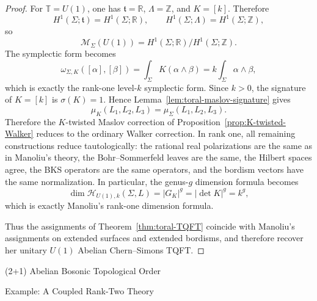 \documentclass[12pt]{amsart}
\makeatletter
\renewcommand\section{\@startsection{section}{1}%
  \z@{.7\linespacing\@plus\linespacing}{.5\linespacing}%
  {\normalfont\bfseries\centering}}
\renewcommand\subsection{\@startsection{subsection}{2}%
  \z@{.5\linespacing\@plus.7\linespacing}{-.5em}%
  {\normalfont\bfseries}}
\numberwithin{equation}{section}
\makeatother
\begin{document}
\begin{proof}
For \(\mathbb T=U(1)\), one has \(\mathfrak t=\mathbb R\), \(\Lambda=\mathbb Z\), and
\(K=[k]\). Therefore
\[
H^1(\Sigma;\mathfrak t)=H^1(\Sigma;\mathbb R),\qquad
H^1(\Sigma;\Lambda)=H^1(\Sigma;\mathbb Z),
\]
so
\[
\mathcal M_\Sigma(U(1))
=
H^1(\Sigma;\mathbb R)/H^1(\Sigma;\mathbb Z).
\]
The symplectic form becomes
\[
\omega_{\Sigma,K}([\alpha],[\beta])
=
\int_\Sigma K(\alpha\wedge\beta)
=
k\int_\Sigma \alpha\wedge\beta,
\]
which is exactly the rank-one level-\(k\) symplectic form. Since \(k>0\), the signature of \(K=[k]\) is $\sigma(K)=1.$ Hence Lemma~\ref{lem:toral-maslov-signature} gives
\[
\mu_K(L_1,L_2,L_3)=\mu_\Sigma(L_1,L_2,L_3).
\]
Therefore the \(K\)-twisted Maslov correction of
Proposition~\ref{prop:K-twisted-Walker} reduces to the ordinary Walker correction. In rank one, all remaining constructions reduce tautologically:
the rational real polarizations are the same as in Manoliu's theory,
the Bohr--Sommerfeld leaves are the same,
the Hilbert spaces agree,
the BKS operators are the same operators,
and the bordism vectors have the same normalization.
In particular, the genus-\(g\) dimension formula becomes
\[
\dim \mathcal H_{U(1),k}(\Sigma,L)
=
|G_K|^g
=
|\det K|^g
=
k^g,
\]
which is exactly Manoliu's rank-one dimension formula.

Thus the assignments of
Theorem~\ref{thm:toral-TQFT} coincide with Manoliu's assignments on extended
surfaces and extended bordisms, and therefore recover her unitary \(U(1)\)
Abelian Chern--Simons TQFT.
\end{proof}



\section{(2+1) Abelian Bosonic Topological Order}


\subsection{Example: A Coupled Rank-Two Theory}
\label{subsec:A2example}
\end{document}
